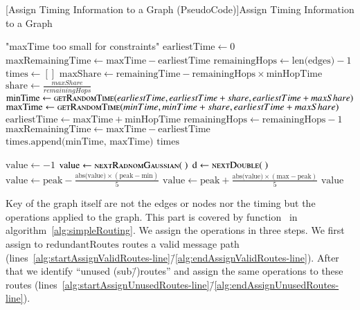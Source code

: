 \begin{breakablealgorithm}
	[Assign Timing Information to a Graph (PseudoCode)]{Assign Timing Information to a Graph}\label{alg:simpleTiming}
	\begin{algorithmic}[1]
		\label{alg:getTiming-line}
				\Throw "maxTime too small for constraints"
			\EndIf
			\State $\text{earliestTime} \gets 0$
			\State $\text{maxRemainingTime} \gets \text{maxTime}-\text{earliestTime}$
			\State $\text{remainingHops} \gets \text{len(edges)} - 1$
			\State $\text{times} \gets []$
				\State $\text{maxShare} \gets \text{remainingTime} - \text{remainingHops}\times\text{minHopTime}$
				\State $\text{share} \gets \frac{maxShare}{remainingHops}$
				\State $\text{minTime} \gets \Call{getRandomTime}{earliestTime, earliestTime+share, earliestTime+maxShare}$\label{alg:minTime-line}
				\State $\text{maxTime} \gets \Call{getRandomTime}{minTime, minTime+share, earliestTime+maxShare}$\label{alg:maxTime-line}
				\State $\text{earliestTime} \gets \text{maxTime}+\text{minHopTime}$
				\State $\text{remainingHops} \gets \text{remainingHops} - 1$
				\State $\text{maxRemainingTime} \gets \text{maxTime}-\text{earliestTime}$
				\State $\text{times.append(minTime, maxTime)}$
			\EndFor
			\Return $\text{times}$
		\EndFunction
		\item[]		
		\label{alg:getRandomTime-line}
			\State $\text{value} \gets -1$
				\State $\text{value} \gets \Call{nextRadnomGaussian}{~}$
				\State $\text{d} \gets \Call{nextDouble}{~}$
					\State $\text{value} \gets \text{peak} - \frac{\text{abs(value)} \times (\text{peak} - \text{min})}{5}$
				\Else
					\State $\text{value} \gets \text{peak} + \frac{\text{abs(value)} \times (\text{max} - \text{peak})}{5}$
				\EndIf
			\EndWhile
			\Return $\text{value}$
		\EndFunction
	\end{algorithmic}
\end{breakablealgorithm}

Key of the graph itself are not the edges or nodes nor the timing but the operations applied to the graph. This part is covered by function~ in algorithm~\ref{alg:simpleRouting}. We assign the operations in three steps. We first assign to $\text{redundantRoutes}$ routes a valid message path (lines~\ref{alg:startAssignValidRoutes-line}\=/\ref{alg:endAssignValidRoutes-line}). After that we identify ``unused (sub\=/)routes'' and assign the same operations to these routes (lines~\ref{alg:startAssignUnusedRoutes-line}\=/\ref{alg:endAssignUnusedRoutes-line}). 

